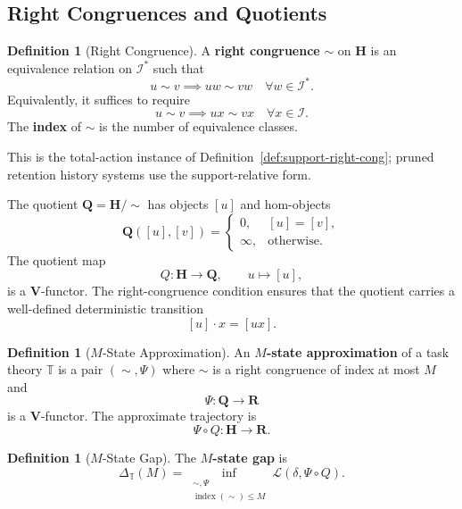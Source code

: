 \documentclass[12pt]{article}
\theoremstyle{definition}
\newtheorem{definition}[theorem]{Definition}
\begin{document}
\subsection{Right Congruences and Quotients}
\label{sec:right-cong}

\begin{definition}[Right Congruence]
\label{def:right-cong}
A \textbf{right congruence} $\sim$ on $\mathbf H$ is an equivalence relation
on $\mathcal I^*$ such that
\[
u\sim v
\implies
uw\sim vw
\quad
\forall w\in\mathcal I^*.
\]
Equivalently, it suffices to require
\[
u\sim v
\implies
ux\sim vx
\quad
\forall x\in\mathcal I.
\]
The \textbf{index} of $\sim$ is the number of equivalence classes.
\end{definition}

This is the total-action instance of Definition~\ref{def:support-right-cong};
pruned retention history systems use the support-relative form.

The quotient $\mathbf Q=\mathbf H/\!\sim$ has objects $[u]$ and hom-objects
\[
\mathbf Q([u],[v])=
\begin{cases}
0,&[u]=[v],\\
\infty,&\text{otherwise}.
\end{cases}
\]
The quotient map
\[
Q:\mathbf H\to\mathbf Q,
\qquad
u\mapsto[u],
\]
is a $\mathbf V$-functor.  The right-congruence condition ensures that the
quotient carries a well-defined deterministic transition
\[
[u]\cdot x=[ux].
\]

\begin{definition}[$M$-State Approximation]
\label{def:M-state-approx}
An \textbf{$M$-state approximation} of a task theory $\mathbb T$ is a pair
$(\sim,\Psi)$ where $\sim$ is a right congruence of index at most $M$ and
\[
\Psi:\mathbf Q\to\mathbf R
\]
is a $\mathbf V$-functor.  The approximate trajectory is
\[
\Psi\circ Q:\mathbf H\to\mathbf R.
\]
\end{definition}

\begin{definition}[$M$-State Gap]
\label{def:M-state-gap}
The \textbf{$M$-state gap} is
\[
\Delta_{\mathbb T}(M)
=
\inf_{\substack{\sim,\Psi\\ \operatorname{index}(\sim)\le M}}
\mathcal L(\delta,\Psi\circ Q).
\]
\end{definition}
\end{document}
